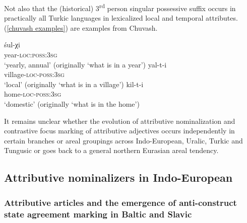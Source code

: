 Not also that the (historical) 3\textsuperscript{rd} person singular possessive suffix occurs in practically all Turkic languages in lexicalized local and temporal attributes. (\ref{chuvash examples}) are examples from Chuvash. 
\begin{exe}
\label{chuvash examples}
\begin{xlist}
\ex
\gll	śul-χi\\
	year-\textsc{loc:poss:3sg}\\
\glt	‘yearly, annual’ (originally ‘what is in a year’)
\ex
\gll	yal-t-i\\
	village-\textsc{loc-poss:3sg}\\
\glt	‘local’ (originally ‘what is in a village’)
\ex
\gll	kil-t-i\\
	home-\textsc{loc-poss:3sg}\\
\glt	‘domestic’ (originally ‘what is in the home’)
\end{xlist}
\end{exe}

It remains unclear whether the evolution of attributive nominalization and contrastive focus marking of attributive adjectives occurs independently in certain branches or areal groupings across Indo-European, Uralic, Turkic and Tungusic or goes back to a general northern Eurasian areal tendency.

\subsection{Attributive nominalizers in Indo-European}
\label{ie diachr}

\subsubsection[Baltic and Slavic]{Attributive articles and the emergence of anti\hyp{}construct state agreement marking in Baltic and Slavic}
\label{slavic diachr}

